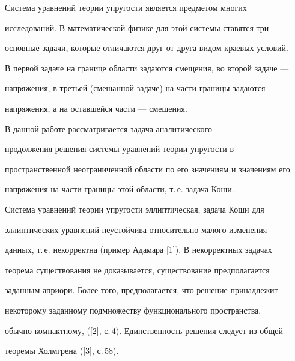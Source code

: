  




\maketitle 


\label{begin} 


 


 


Система уравнений теории упругости является предметом многих 


исследований. В математической физике для этой системы ставятся три 


основные задачи, которые отличаются друг от друга видом краевых условий. 


В первой задаче на границе области задаются смещения, во второй задаче --- 


напряжения, в третьей (смешанной задаче) на части границы задаются 


напряжения, а на оставшейся части --- смещения. 


 


В данной работе рассматривается задача аналитического 


продолжения решения системы уравнений теории упругости в 


пространственной неограниченной области по его значениям и значениям его 


напряжения на части границы этой области, т.\,е. задача Коши. 


 


Система уравнений теории упругости эллиптическая, задача Коши для 


эллиптических уравнений неустойчива относительно малого изменения 


данных, т.\,е. некорректна (пример Адамара [1]). В некорректных задачах 


теорема существования не доказывается, существование предполагается 


заданным априори. Более того, предполагается, что решение принадлежит 


некоторому заданному подмножеству функционального пространства, 


обычно компактному, ([2], с.\,4). Единственность решения следует из общей 


теоремы Холмгрена ([3], с.\,58). 


